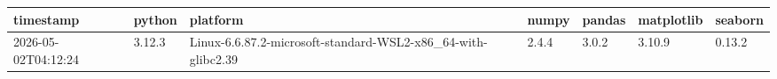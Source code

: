 \begin{tabular}{lllllll}
\toprule
timestamp & python & platform & numpy & pandas & matplotlib & seaborn \\
\midrule
2026-05-02T04:12:24 & 3.12.3 & Linux-6.6.87.2-microsoft-standard-WSL2-x86\_64-with-glibc2.39 & 2.4.4 & 3.0.2 & 3.10.9 & 0.13.2 \\
\bottomrule
\end{tabular}
